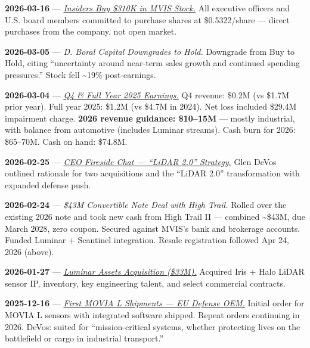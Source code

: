 \documentclass[11pt,letterpaper]{article}
\begin{document}
{\color{datecyan}\textbf{2026-03-16}} --- \textit{\href{https://www.stocktitan.net/news/MVIS/micro-vision-ceo-directors-and-executives-buy-mvis-4d82b0ctt79m.html}{Insiders Buy \$310K in MVIS Stock.}}
All executive officers and U.S. board members committed to purchase shares at \$0.5322/share --- direct purchases from the company, not open market.

{\color{datecyan}\textbf{2026-03-05}} --- \textit{D. Boral Capital Downgrades to Hold.}
Downgrade from Buy to Hold, citing ``uncertainty around near-term sales growth and continued spending pressures.'' Stock fell \textasciitilde19\% post-earnings.

{\color{datecyan}\textbf{2026-03-04}} --- \textit{\href{https://seekingalpha.com/news/4561075-microvision-outlines-10m-15m-2026-revenue-target-amid-lidar-2_0-transformation-and-expanded}{Q4 \& Full Year 2025 Earnings.}}
Q4 revenue: \$0.2M (vs \$1.7M prior year). Full year 2025: \$1.2M (vs \$4.7M in 2024). Net loss included \$29.4M impairment charge. \textbf{2026 revenue guidance: \$10--15M} --- mostly industrial, with balance from automotive (includes Luminar streams). Cash burn for 2026: \$65--70M. Cash on hand: \$74.8M.

{\color{datecyan}\textbf{2026-02-25}} --- \textit{\href{https://ir.microvision.com/news/press-releases/detail/438/microvision-business-update-and-fireside-chat-on-february}{CEO Fireside Chat --- ``LiDAR 2.0'' Strategy.}}
Glen DeVos outlined rationale for two acquisitions and the ``LiDAR 2.0'' transformation with expanded defense push.

{\color{datecyan}\textbf{2026-02-24}} --- \textit{\$43M Convertible Note Deal with High Trail.}
Rolled over the existing 2026 note and took new cash from High Trail II --- combined \textasciitilde\$43M, due March 2028, zero coupon. Secured against MVIS's bank and brokerage accounts. Funded Luminar + Scantinel integration. Resale registration followed Apr 24, 2026 (above).

{\color{datecyan}\textbf{2026-01-27}} --- \textit{\href{https://ir.microvision.com/news/press-releases/detail/436/microvision-announces-agreement-to-acquire-luminar-assets}{Luminar Assets Acquisition (\$33M).}}
Acquired Iris + Halo LiDAR sensor IP, inventory, key engineering talent, and select commercial contracts.

{\color{datecyan}\textbf{2025-12-16}} --- \textit{\href{https://ir.microvision.com/news/press-releases/detail/435/microvision-reports-commercial-momentum-in-industrial}{First MOVIA L Shipments --- EU Defense OEM.}}
Initial order for MOVIA L sensors with integrated software shipped. Repeat orders continuing in 2026. DeVos: suited for ``mission-critical systems, whether protecting lives on the battlefield or cargo in industrial transport.''
\end{document}
